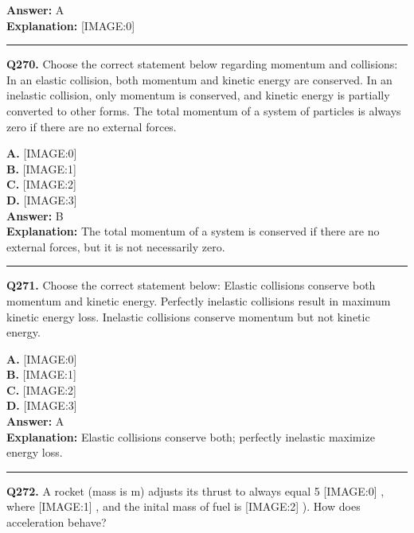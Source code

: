 \documentclass[12pt]{article}
\begin{document}
\textbf{Answer:} A \\
\textbf{Explanation:} [IMAGE:0]

\hrule
\vspace{1em}


\noindent
\textbf{Q270.} Choose the correct statement below regarding momentum and collisions:
In an elastic collision, both momentum and kinetic energy are conserved.
In an inelastic collision, only momentum is conserved, and kinetic energy is partially converted to other forms.
The total momentum of a system of particles is always zero if there are no external forces.



\textbf{A.} [IMAGE:0] \\
\textbf{B.} [IMAGE:1] \\
\textbf{C.} [IMAGE:2] \\
\textbf{D.} [IMAGE:3] \\

\textbf{Answer:} B \\
\textbf{Explanation:} The total momentum of a system is conserved if there are no external forces, but it is not necessarily zero.

\hrule
\vspace{1em}


\noindent
\textbf{Q271.} Choose the correct statement below:
Elastic collisions conserve both momentum and kinetic energy.
Perfectly inelastic collisions result in maximum kinetic energy loss.
Inelastic collisions conserve momentum but not kinetic energy.



\textbf{A.} [IMAGE:0] \\
\textbf{B.} [IMAGE:1] \\
\textbf{C.} [IMAGE:2] \\
\textbf{D.} [IMAGE:3] \\

\textbf{Answer:} A \\
\textbf{Explanation:} Elastic collisions conserve both; perfectly inelastic maximize energy loss.

\hrule
\vspace{1em}


\noindent
\textbf{Q272.} A rocket (mass is m) adjusts its thrust to always equal 5%
[IMAGE:0]
, where
[IMAGE:1]
, and the inital mass of fuel is
[IMAGE:2]
).
How does acceleration behave?
\end{document}

